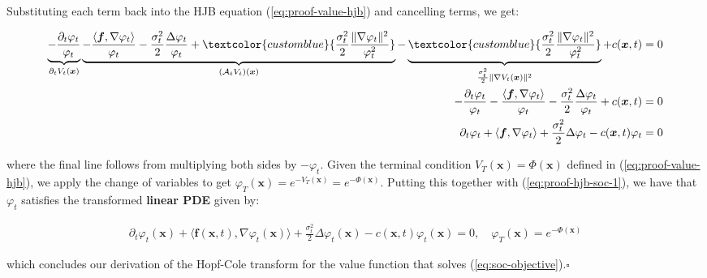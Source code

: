 \documentclass{article}
\newcommand{\bluetext}[1]{\textcolor{customblue}{#1}}
\begin{document}
Substituting each term back into the HJB equation (\ref{eq:proof-value-hjb}) and cancelling terms, we get:
\begin{small}
\begin{align}
    \underbrace{-\frac{\partial_t\varphi_t}{\varphi_t}}_{\partial_tV_t(\boldsymbol{x})}\underbrace{-\frac{\langle\boldsymbol{f}, \nabla \varphi_t\rangle}{\varphi_t}-\frac{\sigma_t^2}{2}\frac{\Delta\varphi_t}{\varphi_t}+\bluetext{\frac{\sigma_t^2}{2}\frac{\|\nabla \varphi_t\|^2}{\varphi_t^2}}}_{(\mathcal{A}_tV_t)(\boldsymbol{x})}-\underbrace{\bluetext{\frac{\sigma_t^2}{2}\frac{\|\nabla \varphi_t\|^2}{\varphi_t^2}}}_{\frac{\sigma_t^2}{2}\|\nabla V_t(\boldsymbol{x})\|^2}+c(\boldsymbol{x},t)&=0\nonumber\\
    -\frac{\partial_t\varphi_t}{\varphi_t}-\frac{\langle\boldsymbol{f}, \nabla \varphi_t\rangle}{\varphi_t}-\frac{\sigma_t^2}{2}\frac{\Delta\varphi_t}{\varphi_t}+c(\boldsymbol{x},t)&=0\nonumber\\
    \partial_t\varphi_t+\langle\boldsymbol{f}, \nabla \varphi_t\rangle+\frac{\sigma_t^2}{2}\Delta\varphi_t-c(\boldsymbol{x},t)\varphi_t&=0\label{eq:proof-hjb-soc-1}
\end{align}
\end{small}
where the final line follows from multiplying both sides by $-\varphi_t$. Given the terminal condition $V_T(\boldsymbol{x})=\Phi(\boldsymbol{x})$ defined in (\ref{eq:proof-value-hjb}), we apply the change of variables to get $\varphi_T(\boldsymbol{x})=e^{-V_T(\boldsymbol{x})}=e^{-\Phi(\boldsymbol{x})}$. Putting this together with (\ref{eq:proof-hjb-soc-1}), we have that $\varphi_t$ satisfies the transformed \textbf{linear PDE} given by:
\begin{small}
\begin{align}
    \boxed{\partial_t\varphi_t(\boldsymbol{x})+\langle\boldsymbol{f}(\boldsymbol{x},t), \nabla \varphi_t(\boldsymbol{x})\rangle+\frac{\sigma_t^2}{2}\Delta\varphi_t(\boldsymbol{x})-c(\boldsymbol{x},t)\varphi_t(\boldsymbol{x})=0, \quad \varphi_T(\boldsymbol{x})=e^{-\Phi(\boldsymbol{x})}}\tag{Hopf-Cole Value PDE}
\end{align}
\end{small}
which concludes our derivation of the Hopf-Cole transform for the value function that solves (\ref{eq:soc-objective}).\hfill $\square$
\end{document}
